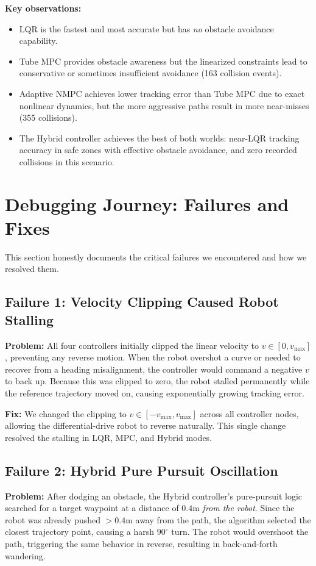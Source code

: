 \documentclass[12pt, a4paper]{article}
\begin{document}
\textbf{Key observations:}
\begin{itemize}
    \item LQR is the fastest and most accurate but has \emph{no} obstacle avoidance capability.
    \item Tube MPC provides obstacle awareness but the linearized constraints lead to conservative or sometimes insufficient avoidance (163 collision events).
    \item Adaptive NMPC achieves lower tracking error than Tube MPC due to exact nonlinear dynamics, but the more aggressive paths result in more near-misses (355 collisions).
    \item The Hybrid controller achieves the best of both worlds: near-LQR tracking accuracy in safe zones with effective obstacle avoidance, and zero recorded collisions in this scenario.
\end{itemize}


\section{Debugging Journey: Failures and Fixes}

This section honestly documents the critical failures we encountered and how we resolved them.

\subsection{Failure 1: Velocity Clipping Caused Robot Stalling}
\textbf{Problem:} All four controllers initially clipped the linear velocity to $v \in [0, v_{\max}]$, preventing any reverse motion. When the robot overshot a curve or needed to recover from a heading misalignment, the controller would command a negative $v$ to back up. Because this was clipped to zero, the robot stalled permanently while the reference trajectory moved on, causing exponentially growing tracking error.

\textbf{Fix:} We changed the clipping to $v \in [-v_{\max}, v_{\max}]$ across all controller nodes, allowing the differential-drive robot to reverse naturally. This single change resolved the stalling in LQR, MPC, and Hybrid modes.

\subsection{Failure 2: Hybrid Pure Pursuit Oscillation}
\textbf{Problem:} After dodging an obstacle, the Hybrid controller's pure-pursuit logic searched for a target waypoint at a distance of $0.4$m \emph{from the robot}. Since the robot was already pushed $>0.4$m away from the path, the algorithm selected the closest trajectory point, causing a harsh $90^\circ$ turn. The robot would overshoot the path, triggering the same behavior in reverse, resulting in back-and-forth wandering.
\end{document}
